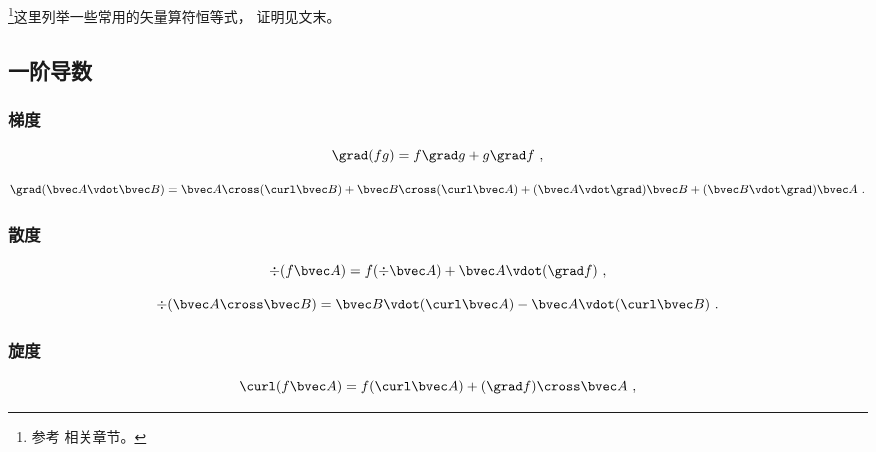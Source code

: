 
\begin{issues}
\end{issues}


\footnote{参考 \cite{GriffE} 相关章节。}这里列举一些常用的矢量算符恒等式， 证明见文末。

\subsection{一阶导数}
\subsubsection{梯度}
\begin{equation}\label{eq_VopEq_2}
\grad (fg) = f\grad g + g \grad f~,
\end{equation}

\begin{equation}
\grad (\bvec A \vdot \bvec B) = \bvec A \cross (\curl \bvec B) + \bvec B \cross (\curl \bvec A) + (\bvec A \vdot \grad) \bvec B + (\bvec B \vdot \grad) \bvec A~.
\end{equation}

\subsubsection{散度}

\begin{equation}\label{eq_VopEq_1}
\div (f \bvec A) = f (\div \bvec A) + \bvec A \vdot (\grad f)~,
\end{equation}

\begin{equation}\label{eq_VopEq_4}
\div (\bvec A \cross \bvec B) = \bvec B \vdot (\curl \bvec A) - \bvec A \vdot (\curl \bvec B)~.
\end{equation}

\subsubsection{旋度}
\begin{equation}\label{eq_VopEq_3}
\curl(f\bvec A) = f (\curl\bvec A) + (\grad f) \cross\bvec A~,
\end{equation}

